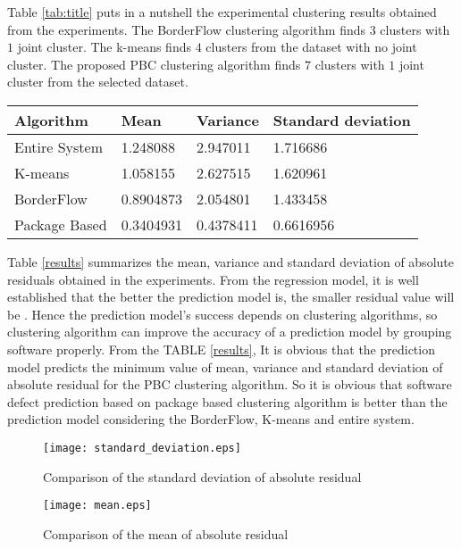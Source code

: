 \documentclass[12pt]{report}
\begin{document}
Table \ref{tab:title} puts in a nutshell the experimental clustering results obtained from the experiments. The BorderFlow clustering algorithm finds $3$ clusters with $1$ joint cluster. The k-means finds $4$ clusters from the dataset with no joint cluster. The proposed PBC clustering algorithm finds $7$ clusters with $1$ joint cluster from the selected dataset.

\begin{center}
\centering
{} \label{results} 
    \begin{tabular}{ | p{3cm} | p{3cm} | p{3cm} |p{3cm}|}
			\hline
				Algorithm &	Mean	& Variance &	Standard deviation \\ \hline
				Entire System&	1.248088 &	2.947011 &	1.716686\\ \hline
				K-means	& 1.058155 &	2.627515 &	1.620961 \\ \hline
				BorderFlow &	0.8904873	& 2.054801	& 1.433458 \\ \hline
				Package Based &	0.3404931 &	0.4378411 &	0.6616956\\ 
			\hline
    \end{tabular}
\end{center}

Table \ref{results} summarizes the mean, variance and standard deviation of absolute residuals obtained in the experiments. From the regression model, it is well established that the better the prediction model is, the smaller residual value will be \cite{draper1981applied}. Hence the prediction model's success depends on clustering algorithms, so clustering algorithm can improve the accuracy of a prediction model by grouping software properly. From the TABLE \ref{results}, It is obvious that the prediction model predicts the minimum value of mean, variance and standard deviation of absolute residual for the PBC clustering algorithm. So it is obvious that software defect prediction based on package based clustering algorithm is better than the prediction model considering the BorderFlow, K-means and entire system.
 
 \begin{figure}[h!]
  \centering
    \texttt{[image: standard\_deviation.eps]}
		\caption{Comparison of the standard deviation of absolute residual}
		\label{StandardDeviation}
\end{figure}


\begin{figure}[h!]
\centering
     \texttt{[image: mean.eps]}
		 \caption{Comparison of the mean of absolute residual}
		\label{MeanAbsoluteResidual}
\end{figure}
\end{document}
